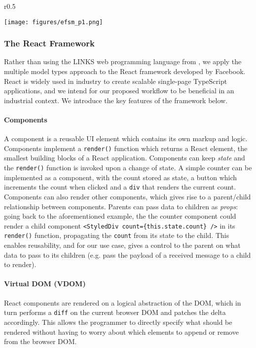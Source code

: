 \documentclass[submission,copyright,creativecommons]{eptcs}
\begin{document}
\begin{wrapfigure}{r}{0.5\textwidth}
  \begin{center}
    \texttt{[image: figures/efsm\_p1.png]}
  \end{center}

  \label{fig:efsmp1}
\end{wrapfigure}

\subsubsection{The React Framework}
Rather than using the LINKS web programming language from \cite{MVU2019}, we apply the multiple model types approach to the React framework \cite{React} developed by Facebook. React is widely used in industry to create scalable single-page TypeScript applications, and we intend for our proposed workflow to be beneficial in an industrial context. We introduce the key features of the framework below.

\paragraph{Components} A component is a reusable UI element which
contains its own markup and logic. Components implement a
\texttt{render()} function which returns a React element, the smallest
building blocks of a React application. Components can keep
\textit{state} and the \texttt{render()} function is invoked upon a
change of state. A simple counter can be implemented as a component,
with the count stored as state, a button which increments the count
when clicked and a \texttt{div} that renders the current
count. Components can also render other components, which gives rise
to a parent/child relationship between components. Parents can pass
data to children as \textit{props}: going back to the aforementioned
example, the the counter component could render a child component
\texttt{<StyledDiv count=\{this.state.count\} />} in its
\texttt{render()} function, propagating the \texttt{count} from its
state to the child. This enables reusability, and for our use case,
gives a control to the parent on what data to pass to its children (e.g. pass the payload of a received message to a child to render).

\paragraph{Virtual DOM (VDOM)} React components are rendered on a logical abstraction of the DOM, which in turn performs a \texttt{diff} on the current browser DOM and patches the delta accordingly. This allows the programmer to directly specify what should be rendered without having to worry about which elements to append or remove from the browser DOM.
\end{document}
